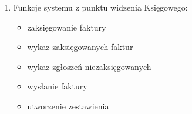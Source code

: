 \begin{enumerate}
\item Funkcje systemu z punktu widzenia Księgowego:
	\begin{itemize}
		\item zaksięgowanie faktury
		\item wykaz zaksięgowanych faktur
		\item wykaz zgłoszeń niezaksięgowanych
		\item wysłanie faktury
		\item utworzenie zestawienia
	\end{itemize}
\end{enumerate}
